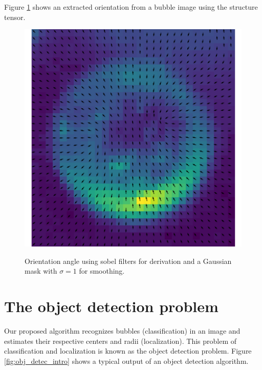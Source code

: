 		Figure \ref{fig:struct_tensor_demo} shows an extracted orientation from a bubble image using the structure tensor.
		
		\begin{figure}
			\centering
			\caption{Orientation angle using sobel filters for derivation and a Gaussian mask with $\sigma =1$ for smoothing.}		
			\includegraphics[scale=0.4]{images/structure_tensor_demo.png}
			\label{fig:struct_tensor_demo}
		\end{figure}
		
	
	\section{The object detection problem}\label{the_object_detection_problem}
	
	Our proposed algorithm recognizes bubbles (classification) in an image and estimates their respective centers and radii (localization). This problem of classification and localization is known as the object detection problem. Figure \ref{fig:obj_detec_intro} shows a typical output of an object detection algorithm. 
	
